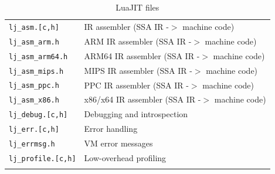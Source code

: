 \begin{center}
\begin{longtable}{|p{4cm}|p{9cm}|}
\hline

\texttt{lj\_asm.[c,h]} & IR assembler (SSA IR -$>$ machine code)\\
\texttt{lj\_asm\_arm.h} & ARM IR assembler (SSA IR -$>$ machine code)\\
\texttt{lj\_asm\_arm64.h} & ARM64 IR assembler (SSA IR -$>$ machine code)\\
\texttt{lj\_asm\_mips.h} & MIPS IR assembler (SSA IR -$>$ machine code)\\
\texttt{lj\_asm\_ppc.h} & PPC IR assembler (SSA IR -$>$ machine code)\\
\texttt{lj\_asm\_x86.h} & x86/x64 IR assembler (SSA IR -$>$ machine code)\\

\hline

\texttt{lj\_debug.[c,h]} & Debugging and introspection\\
\texttt{lj\_err.[c,h]} & Error handling\\
\texttt{lj\_errmsg.h} & VM error messages\\
\texttt{lj\_profile.[c,h]} & Low-overhead profiling\\

\hline
\caption{LuaJIT files}
\label{tab:files-luajit}
\end{longtable}
\end{center}

